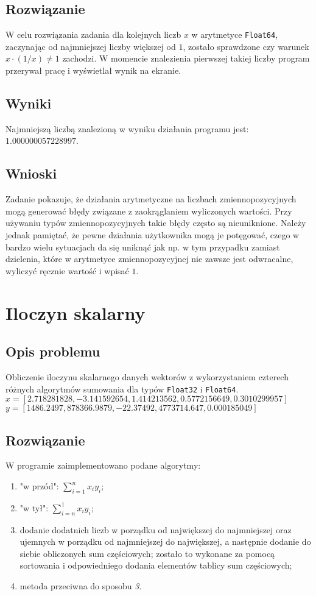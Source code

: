 \documentclass[11pt,a4paper]{article}
\begin{document}
\subsection{Rozwiązanie}
W celu rozwiązania zadania dla kolejnych liczb $x$ w arytmetyce \texttt{Float64}, zaczynając od najmniejszej liczby większej od $1$, zostało sprawdzone czy warunek $x\cdot (1/{x})\neq 1$ zachodzi. W momencie znalezienia pierwszej takiej liczby program przerywał pracę i wyświetlał wynik na ekranie.
\subsection{Wyniki}
Najmniejszą liczbą znalezioną w wyniku działania programu jest: $1.000000057228997$.
\subsection{Wnioski}
Zadanie pokazuje, że działania arytmetyczne na liczbach zmiennopozycyjnych mogą generować błędy związane z zaokrąglaniem wyliczonych wartości. Przy używaniu typów zmiennopozycyjnych takie błędy często są nieuniknione. Należy jednak pamiętać, że pewne działania użytkownika mogą je potęgować, czego w bardzo wielu sytuacjach da się uniknąć jak np. w tym przypadku zamiast dzielenia, które w arytmetyce zmiennopozycyjnej nie zawsze jest odwracalne, wyliczyć ręcznie wartość i wpisać $1$.
\section{Iloczyn skalarny}
\subsection{Opis problemu}
Obliczenie iloczynu skalarnego danych wektorów z wykorzystaniem czterech różnych algorytmów sumowania dla typów \texttt{Float32} i \texttt{Float64}. \\
$x = [2.718281828, -3.141592654, 1.414213562, 0.5772156649, 0.3010299957]$ \\
$y = [1486.2497, 878366.9879, -22.37492, 4773714.647, 0.000185049]$
\subsection{Rozwiązanie}
W programie zaimplementowano podane algorytmy:
\begin{enumerate}
\item "w przód": $\sum_{i=1}^{n} x_iy_i$;
\item "w tył": $\sum_{i=n}^{1} x_iy_i$;
\item dodanie dodatnich liczb w porządku od największej do najmniejszej oraz ujemnych w porządku od najmniejszej do największej, a następnie dodanie do siebie obliczonych sum częściowych; zostało to wykonane za pomocą sortowania i odpowiedniego dodania elementów tablicy sum częściowych;
\item metoda przeciwna do sposobu \emph{3}.
\end{enumerate}
\end{document}
